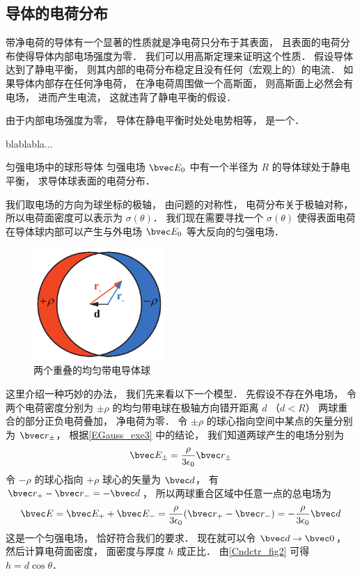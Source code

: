 

\subsection{导体的电荷分布}
带净电荷的导体有一个显著的性质就是净电荷只分布于其表面， 且表面的电荷分布使得导体内部电场强度为零． 我们可以用高斯定理来证明这个性质． 假设导体达到了静电平衡， 则其内部的电荷分布稳定且没有任何（宏观上的）的电流． 如果导体内部存在任何净电荷， 在净电荷周围做一个高斯面， 则高斯面上必然会有电场， 进而产生电流， 这就违背了静电平衡的假设．

由于内部电场强度为零， 导体在静电平衡时处处电势相等， 是一个．


blablabla...

\begin{exam}{匀强电场中的球形导体}
匀强电场 $\bvec E_0$ 中有一个半径为 $R$ 的导体球处于静电平衡， 求导体球表面的电荷分布．

我们取电场的方向为球坐标的极轴， 由问题的对称性， 电荷分布关于极轴对称， 所以电荷面密度可以表示为 $\sigma(\theta)$． 我们现在需要寻找一个 $\sigma(\theta)$ 使得表面电荷在导体球内部可以产生与外电场 $\bvec E_0$ 等大反向的匀强电场．

\begin{figure}[ht]
\centering
\includegraphics[width=5cm]{./figures/Cndctr1.pdf}
\caption{两个重叠的均匀带电导体球} \label{Cndctr_fig1}
\end{figure}

这里介绍一种巧妙的办法， 我们先来看以下一个模型． 先假设不存在外电场， 令两个电荷密度分别为 $\pm\rho$ 的均匀带电球在极轴方向错开距离 $d$ （$d < R$） 两球重合的部分正负电荷叠加， 净电荷为零． 令 $\pm\rho$ 的球心指向空间中某点的矢量分别为 $\bvec r_\pm$， 根据\autoref{EGauss_exe3} 中的结论， 我们知道两球产生的电场分别为
\begin{equation}
\bvec E_\pm = \frac{\rho}{3\epsilon_0}\bvec r_\pm
\end{equation}
令 $-\rho$ 的球心指向 $+\rho$ 球心的矢量为 $\bvec d$， 有 $\bvec r_+ - \bvec r_- = -\bvec d$， 所以两球重合区域中任意一点的总电场为
\begin{equation}
\bvec E = \bvec E_+ + \bvec E_- = \frac{\rho}{3\epsilon_0}(\bvec r_+ - \bvec r_-) = -\frac{\rho}{3\epsilon_0}\bvec d
\end{equation}
这是一个匀强电场， 恰好符合我们的要求． 现在就可以令 $\bvec d\to \bvec 0$， 然后计算电荷面密度， 面密度与厚度 $h$ 成正比． 由\autoref{Cndctr_fig2} 可得 $h = d\cos\theta$．


\end{exam}
